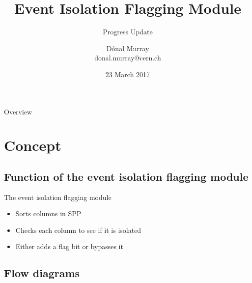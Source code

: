 \documentclass{beamer}
\title{Event Isolation Flagging Module}
\subtitle{Progress Update}
\author[Dónal Murray\hspace*{80pt}donal.murray@cern.ch]{Dónal Murray \\
  \vskip7pt
  \tiny{donal.murray@cern.ch}
}
\institute{}
\date{23 March 2017}
\begin{document}
{
\begin{frame}
  \titlepage
\end{frame}
}
\addtocounter{framenumber}{-1} %

\begin{frame}{Overview}
  \tableofcontents
\end{frame}





\section{Concept}

\subsection{Function of the event isolation flagging module}

\begin{frame}{The event isolation flagging module}
  \begin{itemize}
  \item
    Sorts columns in SPP
  \item
    Checks each column to see if it is isolated
  \item
    Either adds a flag bit or bypasses it
  \end{itemize}
\end{frame}



\subsection{Flow diagrams}
\end{document}
